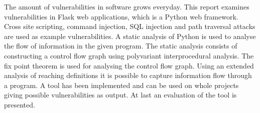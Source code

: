 The amount of vulnerabilities in software grows everyday.
This report examines vulnerabilities in Flask web applications, which is a Python web framework.
Cross site scripting, command injection, SQL injection and path traversal attacks are used as example vulnerabilities.
A static analysis of Python is used to analyse the flow of information in the given program.
The static analysis consists of constructing a control flow graph using polyvariant interprocedural analysis.
The fix point theorem is used for analysing the control flow graph.
Using an extended analysis of reaching definitions it is possible to capture information flow through a program.
A tool has been implemented and can be used on whole projects giving possible vulnerabilities as output.
At last an evaluation of the tool is presented.
